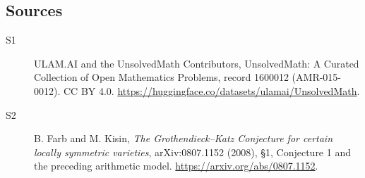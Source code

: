 \documentclass[11pt]{article}
\begin{document}
\subsection{Sources}
\begin{description}
\item[\hypertarget{source:1600012:1}{S1}] ULAM.AI and the UnsolvedMath Contributors, UnsolvedMath: A Curated Collection of Open Mathematics Problems, record 1600012 (AMR-015-0012). CC BY 4.0. \url{https://huggingface.co/datasets/ulamai/UnsolvedMath}.
\item[\hypertarget{source:1600012:2}{S2}] B. Farb and M. Kisin, \emph{The Grothendieck--Katz Conjecture for certain locally symmetric varieties}, arXiv:0807.1152 (2008), §1, Conjecture 1 and the preceding arithmetic model. \url{https://arxiv.org/abs/0807.1152}.
\end{description}
\label{end:1600012}
\end{document}
